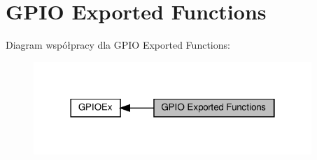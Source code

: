 \hypertarget{group___g_p_i_o_ex___exported___functions}{}\section{G\+P\+IO Exported Functions}
\label{group___g_p_i_o_ex___exported___functions}
Diagram współpracy dla G\+P\+IO Exported Functions\+:\nopagebreak
\begin{figure}[H]
\begin{center}
\leavevmode
\includegraphics[width=298pt]{group___g_p_i_o_ex___exported___functions}
\end{center}
\end{figure}
